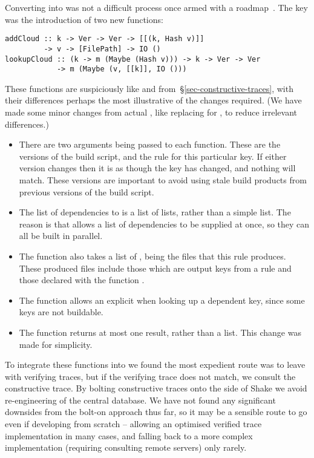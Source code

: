 Converting \Shake into \Cloud \Shake was not a difficult process once armed with
a roadmap~\cite{mokhov2018buildsystems}. The key was the introduction of two new
functions:

\vspace{1mm}
\begin{verbatim}
addCloud :: k -> Ver -> Ver -> [[(k, Hash v)]]
         -> v -> [FilePath] -> IO ()
lookupCloud :: (k -> m (Maybe (Hash v))) -> k -> Ver -> Ver
            -> m (Maybe (v, [[k]], IO ()))
\end{verbatim}
\vspace{1mm}

\noindent
These functions are suspiciously like  and 
from~\S\ref{sec-constructive-traces}, with their differences perhaps the most
illustrative of the changes required. (We have made some minor changes from
actual \Shake, like replacing  for , to reduce irrelevant
differences.)

\begin{itemize}
\item There are two  arguments being passed to each function. These are
      the versions of the build script, and the rule for this particular key. If
      either version changes then it is as though the key has changed, and
      nothing will match. These versions are important to avoid using stale
      build products from previous versions of the build script.
\item The list of dependencies to  is a list of lists, rather than
      a simple list. The reason is that \Shake allows a list of dependencies to
      be supplied at once, so they can all be built in parallel.
\item The  function also takes a list of , being the
      files that this rule produces. These produced files include those which
      are output keys from a rule and those declared with the function
      .
\item The  function allows an explicit  when looking
      up a dependent key, since some keys are not buildable.
\item The  function returns at most one result, rather than a
      list. This change was made for simplicity.
\end{itemize}

To integrate these functions into \Shake we found the most expedient route was
to leave \Shake with verifying traces, but if the verifying trace does not
match, we consult the constructive trace. By bolting constructive traces onto
the side of Shake we avoid re-engineering of the central database. We have not
found any significant downsides from the bolt-on approach thus far, so it may be
a sensible route to go even if developing from scratch -- allowing an optimised
verified trace implementation in many cases, and falling back to a more complex
implementation (requiring consulting remote servers) only rarely.

